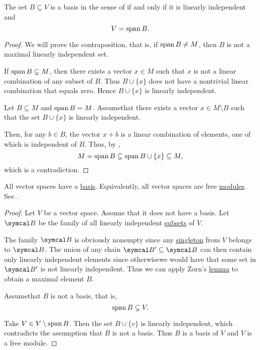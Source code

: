 \begin{proposition}\label{thm:vector_space_basis}
  The set \( B \subseteq V \) is a basis in the sense of  if and only if it is linearly independent and
  \begin{equation*}
    V = \operatorname{span}{B}.
  \end{equation*}
\end{proposition}
\begin{proof}
  \Implies We will prove the contraposition, that is, if \( \operatorname{span}{B} \neq M \), then \( B \) is not a maximal linearly independent set.

  If \( \operatorname{span}{B} \subsetneq M \), then there exists a vector \( x \in M \) such that \( x \) is not a linear combination of any subset of \( B \). Thus \( B \cup \{ x \} \) does not have a nontrivial linear combination that equals zero. Hence \( B \cup \{ x \} \) is linearly independent.

  \ImpliedBy Let \( B \subseteq M \) and \( \operatorname{span}{B} = M \). Assume\LEM that there exists a vector \( x \in M \setminus B \) such that the set \( B \cup \{ x \} \) is linearly independent.

  Then, for any \( b \in B \), the vector \( x + b \) is a linear combination of elements, one of which is independent of \( B \). Thus, by ,
  \begin{equation*}
    M = \operatorname{span}{B} \subsetneq \operatorname{span}{B \cup \{ x \}} \subseteq M,
  \end{equation*}
  which is a contradiction.
\end{proof}

\begin{theorem}\label{thm:all_vector_spaces_are_free_left_modules}
  All vector spaces have a \hyperref[def:left_module_hamel_basis]{basis}. Equivalently, all vector spaces are free \hyperref[def:free_left_module]{modules}. See .
\end{theorem}
\begin{proof}
  Let \( V \) be a vector space. Assume that it does not have a basis. Let \( \Cal{B} \) be the family of all linearly independent \hyperref[def:linear_combination]{subsets} of \( V \).

  The family \( \Cal{B} \) is obviously nonempty since any \hyperref[remark:singleton_sets]{singleton} from \( V \) belongs to \( \Cal{B} \). The union of any chain \( \Cal{B}' \subseteq \Cal{B} \) can then contain only linearly independent elements since otherwise\LEM we would have that some set in \( \Cal{B}' \) is not linearly independent. Thus we can apply Zorn's \hyperref[thm:aoc/zorn]{lemma} to obtain a maximal element \( B \).

  Assume\LEM that \( B \) is not a basis, that is,
  \begin{equation*}
    \operatorname{span} B \subsetneq V.
  \end{equation*}

  Take \( V \in V \setminus \operatorname{span} B \). Then the set \( B \cup \{ v \} \) is linearly independent, which contradicts the assumption that \( B \) is not a basis. Thus \( B \) is a basis of \( V \) and \( V \) is a free module.
\end{proof}

